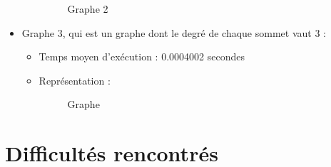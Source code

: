 \documentclass[a4paper, 11pt, oneside]{article}
\begin{document}
\begin{itemize}
\begin{itemize}
\begin{figure}[h]
				\qquad
				\caption{Graphe 2}%
				\label{fig:graphe2}%
			\end{figure}
		\end{itemize}
		\newpage
		\item Graphe 3, qui est un graphe dont le degré de chaque sommet vaut 3 :
		\begin{itemize}
			\item Temps moyen d'exécution : 0.0004002 secondes
			\item Représentation :
			\begin{figure}[h]%
				\centering
				\qquad
				\caption{Graphe }%
				\label{fig:grphe3}%
			\end{figure}
		\end{itemize}
	\end{itemize}
	\newpage

	\section{Difficultés rencontrés}
\end{document}

